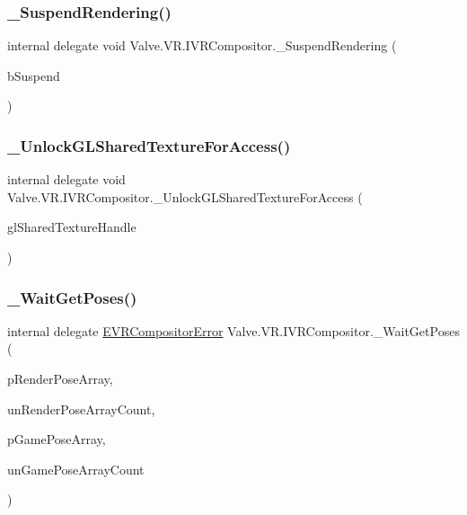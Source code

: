 \subsubsection{\texorpdfstring{\_SuspendRendering()}{\_SuspendRendering()}}
{\footnotesize\ttfamily internal delegate void Valve.\+V\+R.\+I\+V\+R\+Compositor.\+\_\+\+Suspend\+Rendering (\begin{DoxyParamCaption}\item[{bool}]{b\+Suspend }\end{DoxyParamCaption})}

\mbox{\label{struct_valve_1_1_v_r_1_1_i_v_r_compositor_ad503ea42a467e1498243ff87b76188f0}} 
\subsubsection{\texorpdfstring{\_UnlockGLSharedTextureForAccess()}{\_UnlockGLSharedTextureForAccess()}}
{\footnotesize\ttfamily internal delegate void Valve.\+V\+R.\+I\+V\+R\+Compositor.\+\_\+\+Unlock\+G\+L\+Shared\+Texture\+For\+Access (\begin{DoxyParamCaption}\item[{Int\+Ptr}]{gl\+Shared\+Texture\+Handle }\end{DoxyParamCaption})}

\mbox{\label{struct_valve_1_1_v_r_1_1_i_v_r_compositor_a526e58af311d731d5802cb0d3736f7de}} 
\subsubsection{\texorpdfstring{\_WaitGetPoses()}{\_WaitGetPoses()}}
{\footnotesize\ttfamily internal delegate \mbox{\hyperlink{namespace_valve_1_1_v_r_ac34ee1034fda668ccd45f57676ded81b}{E\+V\+R\+Compositor\+Error}} Valve.\+V\+R.\+I\+V\+R\+Compositor.\+\_\+\+Wait\+Get\+Poses (\begin{DoxyParamCaption}\item[{\mbox{[}\+In, Out\mbox{]} \mbox{\hyperlink{struct_valve_1_1_v_r_1_1_tracked_device_pose__t}{Tracked\+Device\+Pose\+\_\+t}} \mbox{[}$\,$\mbox{]}}]{p\+Render\+Pose\+Array,  }\item[{uint}]{un\+Render\+Pose\+Array\+Count,  }\item[{\mbox{[}\+In, Out\mbox{]} \mbox{\hyperlink{struct_valve_1_1_v_r_1_1_tracked_device_pose__t}{Tracked\+Device\+Pose\+\_\+t}} \mbox{[}$\,$\mbox{]}}]{p\+Game\+Pose\+Array,  }\item[{uint}]{un\+Game\+Pose\+Array\+Count }\end{DoxyParamCaption})}



